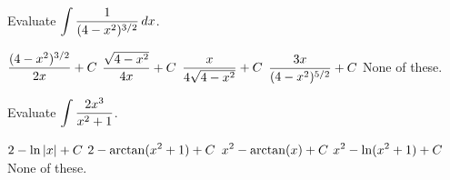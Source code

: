 \documentclass[12pt]{exam}
\newcommand{\ds}{\ensuremath{\displaystyle}}
\begin{document}
\begin{center}
\end{center}
\vspace{0.1in}

\begin{questions}

\setcounter{question}{0}
\question[10]
Evaluate $\ds \int \frac{1}{(4-x^2)^{3/2}} \, dx$.

\begin{checkboxes}
\choice $\ds\frac{(4-x^2)^{3/2}}{2x} + C$
\choice $\ds\frac{\sqrt{4-x^2}}{4x} + C$
\CorrectChoice $\ds\frac{x}{4\sqrt{4-x^2}} + C$
\choice $\ds\frac{3x}{(4-x^2)^{5/2}} + C$
\choice None of these.
\end{checkboxes}

\vfill

\question[10]
Evaluate $\ds \int \frac{2x^3}{x^2+1}$.

\begin{checkboxes}
\choice $\ds 2 - \ln|x|+C$
\choice $\ds 2 - \arctan(x^2+1)+C$
\choice $\ds x^2-\arctan(x)+C$
\CorrectChoice $\ds x^2-\ln(x^2+1)+C$
\choice None of these.
\end{checkboxes}

\vfill

\end{questions}
\end{document}
